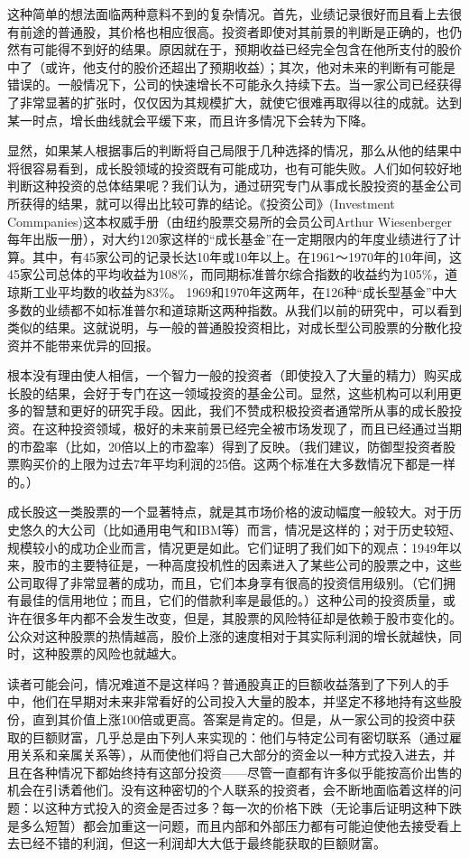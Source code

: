 \documentclass[12pt,oneside]{book}
\begin{document}
这种简单的想法面临两种意料不到的复杂情况。首先，业绩记录很好而且看上去很有前途的普通股，其价格也相应很高。投资者即使对其前景的判断是正确的，也仍然有可能得不到好的结果。原因就在于，预期收益已经完全包含在他所支付的股价中了（或许，他支付的股价还超出了预期收益）；其次，他对未来的判断有可能是错误的。一般情况下，公司的快速增长不可能永久持续下去。当一家公司已经获得了非常显著的扩张时，仅仅因为其规模扩大，就使它很难再取得以往的成就。达到某一时点，增长曲线就会平缓下来，而且许多情况下会转为下降。

显然，如果某人根据事后的判断将自己局限于几种选择的情况，那么从他的结果中将很容易看到，成长股领域的投资既有可能成功，也有可能失败。人们如何较好地判断这种投资的总体结果呢？我们认为，通过研究专门从事成长股投资的基金公司所获得的结果，就可以得出比较可靠的结论。《投资公司》(Investment Commpanies)这本权威手册（由纽约股票交易所的会员公司Arthur Wiesenberger每年出版一册），对大约120家这样的“成长基金”在一定期限内的年度业绩进行了计算。其中，有45家公司的记录长达10年或10年以上。在1961～1970年的10年间，这45家公司总体的平均收益为108\%，而同期标准普尔综合指数的收益约为105\%，道琼斯工业平均数的收益为83\%。 1969和1970年这两年，在126种“成长型基金”中大多数的业绩都不如标准普尔和道琼斯这两种指数。从我们以前的研究中，可以看到类似的结果。这就说明，与一般的普通股投资相比，对成长型公司股票的分散化投资并不能带来优异的回报。

根本没有理由使人相信，一个智力一般的投资者（即使投入了大量的精力）购买成长股的结果，会好于专门在这一领域投资的基金公司。显然，这些机构可以利用更多的智慧和更好的研究手段。因此，我们不赞成积极投资者通常所从事的成长股投资。在这种投资领域，极好的未来前景已经完全被市场发现了，而且已经通过当期的市盈率（比如，20倍以上的市盈率）得到了反映。（我们建议，防御型投资者股票购买价的上限为过去7年平均利润的25倍。这两个标准在大多数情况下都是一样的。）

成长股这一类股票的一个显著特点，就是其市场价格的波动幅度一般较大。对于历史悠久的大公司（比如通用电气和IBM等）而言，情况是这样的；对于历史较短、规模较小的成功企业而言，情况更是如此。它们证明了我们如下的观点：1949年以来，股市的主要特征是，一种高度投机性的因素进入了某些公司的股票之中，这些公司取得了非常显著的成功，而且，它们本身享有很高的投资信用级别。（它们拥有最佳的信用地位；而且，它们的借款利率是最低的。）这种公司的投资质量，或许在很多年内都不会发生改变，但是，其股票的风险特征却是依赖于股市变化的。公众对这种股票的热情越高，股价上涨的速度相对于其实际利润的增长就越快，同时，这种股票的风险也就越大。

读者可能会问，情况难道不是这样吗？普通股真正的巨额收益落到了下列人的手中，他们在早期对未来非常看好的公司投入大量的股本，并坚定不移地持有这些股份，直到其价值上涨100倍或更高。答案是肯定的。但是，从一家公司的投资中获取的巨额财富，几乎总是由下列人来实现的：他们与特定公司有密切联系（通过雇用关系和亲属关系等），从而使他们将自己大部分的资金以一种方式投入进去，并且在各种情况下都始终持有这部分投资——尽管一直都有许多似乎能按高价出售的机会在引诱着他们。没有这种密切的个人联系的投资者，会不断地面临着这样的问题：以这种方式投入的资金是否过多？每一次的价格下跌（无论事后证明这种下跌是多么短暂）都会加重这一问题，而且内部和外部压力都有可能迫使他去接受看上去已经不错的利润，但这一利润却大大低于最终能获取的巨额财富。
\end{document}
